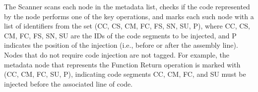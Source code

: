 The Scanner scans each node in the metadata list, checks if the code represented by the node performs one of the key operations, and marks each such node with a list of identifiers from the set (CC, CS, CM, FC, FS, SN, SU, P), where CC, CS, CM, FC, FS, SN, SU are the IDs of the code segments to be injected, and P indicates the position of the injection (i.e., before or after the assembly line). Nodes that do not require code injection are not tagged. For example, the metadata node that represents the Function Return operation is marked with (CC, CM, FC, SU, P), indicating code segments CC, CM, FC, and SU must be injected before the associated line of code.

